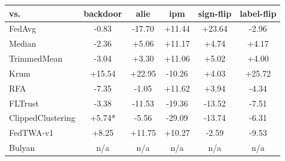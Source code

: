 \begin{tabular}{lccccc}
\toprule
vs. & backdoor & alie & ipm & sign-flip & label-flip \\
\midrule
FedAvg & -0.83 & -17.70 & +11.44 & +23.64 & -2.96 \\
Median & -2.36 & +5.06 & +11.17 & +4.74 & +4.17 \\
TrimmedMean & -3.04 & +3.30 & +11.06 & +5.02 & +4.00 \\
Krum & +15.54 & +22.95 & -10.26 & +4.03 & +25.72 \\
RFA & -7.35 & -1.05 & +11.62 & +3.94 & -4.34 \\
FLTrust & -3.38 & -11.53 & -19.36 & -13.52 & -7.51 \\
ClippedClustering & +5.74* & -5.56 & -29.09 & -13.74 & -6.31 \\
FedTWA-v1 & +8.25 & +11.75 & +10.27 & -2.59 & -9.53 \\
Bulyan & n/a & n/a & n/a & n/a & n/a \\
\bottomrule
\end{tabular}